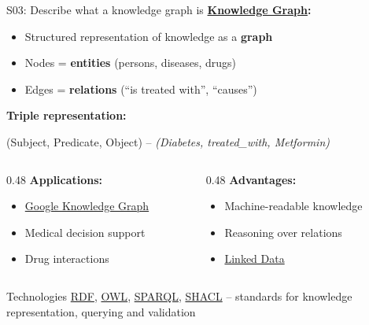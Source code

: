 \documentclass[aspectratio=169, 10pt]{beamer}
\begin{document}
\begin{frame}{S03: Describe what a knowledge graph is}
    \textbf{\href{https://en.wikipedia.org/wiki/Knowledge_graph}{Knowledge Graph}:}
    \begin{itemize}
        \item Structured representation of knowledge as a \textbf{graph}
        \item Nodes = \textbf{entities} (persons, diseases, drugs)
        \item Edges = \textbf{relations} (``is treated with'', ``causes'')
    \end{itemize}
    
    \vspace{0.1cm}
    \textbf{Triple representation:}
    \begin{center}
        (Subject, Predicate, Object) -- \textit{(Diabetes, treated\_with, Metformin)}
    \end{center}
    
    \vspace{0.1cm}
    \begin{columns}[T]
        \begin{column}{0.48\textwidth}
            \textbf{Applications:}
            \begin{itemize}
                \item \href{https://en.wikipedia.org/wiki/Google_Knowledge_Graph}{Google Knowledge Graph}
                \item Medical decision support
                \item Drug interactions
            \end{itemize}
        \end{column}
        \begin{column}{0.48\textwidth}
            \textbf{Advantages:}
            \begin{itemize}
                \item Machine-readable knowledge
                \item Reasoning over relations
                \item \href{https://en.wikipedia.org/wiki/Linked_data}{Linked Data}
            \end{itemize}
        \end{column}
    \end{columns}
    
    \vspace{0.05cm}
    {\scriptsize
    \begin{block}{Technologies}
        \href{https://en.wikipedia.org/wiki/Resource_Description_Framework}{RDF}, \href{https://en.wikipedia.org/wiki/Web_Ontology_Language}{OWL}, \href{https://en.wikipedia.org/wiki/SPARQL}{SPARQL}, \href{https://en.wikipedia.org/wiki/SHACL}{SHACL} -- standards for knowledge representation, querying and validation
    \end{block}
    }
\end{frame}
\end{document}
